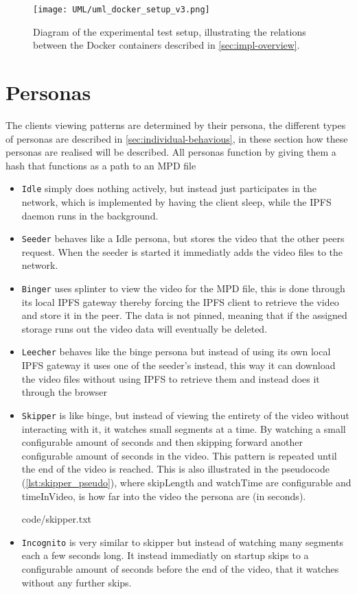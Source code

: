 \begin{figure}[bth]
    \texttt{[image: UML/uml\_docker\_setup\_v3.png]}
    \caption[Diagram of the experimental test  setup]{Diagram of the experimental test setup, illustrating the relations between the Docker containers described in \autoref{sec:impl-overview}.}
    \label{fig:uml_docker-compose}
\end{figure}

\section{Personas}
The clients viewing patterns are determined by their persona, the different types of personas are described in \autoref{sec:individual-behavious}, in these section how these personas are realised will be described.
All personas function by giving them a hash that functions as a path to an \acs{MPD} file
\begin{itemize}
    \item \texttt{Idle} simply does nothing actively, but instead just participates in the network, which is implemented by having the client sleep, while the \acs{IPFS} daemon runs in the background.
    \item \texttt{Seeder} behaves like a Idle persona, but stores the video that the other peers request. When the seeder is started it immediatly adds the video files to the network.
    \item \texttt{Binger} uses splinter to view the video for the \acs{MPD} file, this is done through its local \acs{IPFS} gateway thereby forcing the \acs{IPFS} client to retrieve the video and store it in the peer. The data is not pinned, meaning that if the assigned storage runs out the video data will eventually be deleted.
    \item \texttt{Leecher} behaves like the binge persona but instead of using its own local \acs{IPFS} gateway it uses one of the seeder's instead, this way it can download the video files without using \acs{IPFS} to retrieve them and instead does it through the browser
    \item \texttt{Skipper} is like binge, but instead of viewing the entirety of the video without interacting with it, it watches small segments at a time. By watching a small configurable amount of seconds and then skipping forward another configurable amount of seconds  in the video. This pattern is repeated until the end of the video is reached. This is also illustrated in the pseudocode (\autoref{lst:skipper_pseudo}), where skipLength and watchTime are configurable and timeInVideo, is how far into the video the persona are (in seconds).
    
    {code/skipper.txt}
    \item \texttt{Incognito} is very similar to skipper but instead of watching many segments each a few seconds long. It instead immediatly on startup skips to a configurable amount of seconds before the end of the video, that it watches without any further skips.
\end{itemize}
